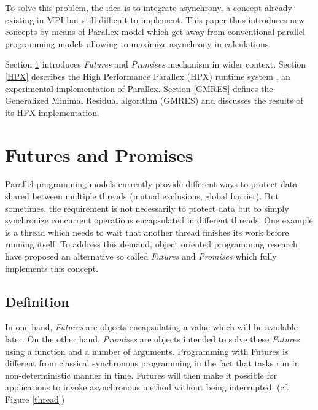 \documentclass{llncs}
\begin{document}
To solve this problem, the idea is to integrate asynchrony, a concept already
existing in MPI but still difficult to implement. This paper thus introduces
new concepts by means of Parallex model which get away from conventional
parallel programming models allowing to maximize asynchrony in
calculations.\smallskip

Section \ref{Futures} introduces \emph{Futures} and \emph{Promises} mechanism
in wider context. Section \ref{HPX} describes the High Performance Parallex
(HPX) runtime system \cite{Parallex}, an experimental implementation of
Parallex. Section \ref{GMRES} defines the Generalized Minimal Residual
algorithm (GMRES) \cite{GMRES} and discusses the results of its HPX
implementation.

\section{Futures and Promises}\label{Futures}
Parallel programming models currently provide different ways to protect data
shared between multiple threads (mutual exclusions, global barrier). But
sometimes, the requirement is not necessarily to protect data but to simply
synchronize concurrent operations encapsulated in different threads. One
example is a thread which needs to wait that another thread finishes its work
before running itself. To address this demand, object oriented programming
research have proposed an alternative so called \emph{Futures} and
\emph{Promises} \cite{Futures1} \cite{Futures2} which fully implements this
concept.

\subsection{Definition}
In one hand, \emph{Futures} are objects encapsulating a value which will be
available later. On the other hand, \emph{Promises} are objects intended to
solve these \emph{Futures} using a function and a number of arguments.
Programming with Futures is different from classical synchronous programming in
the fact that tasks run in non-deterministic manner in time. Futures will then
make it possible for applications to invoke asynchronous method without being
interrupted. (cf. Figure \ref{thread})
\end{document}
